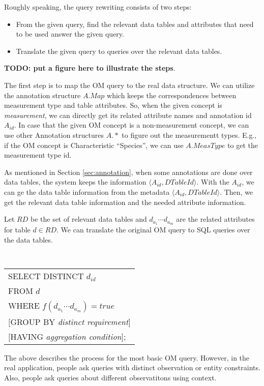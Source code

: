 \documentclass[conference]{IEEEtran}
\begin{document}
Roughly speaking, the query rewriting consists of two steps:
\begin{itemize}
\item From the given query, find the relevant data tables and
  attributes that need to be used answer the given query. 
\item Translate the given query to queries over the relevant data
  tables. 
\end{itemize}

{\bf TODO: put a figure here to illustrate the steps}. 

The first step is to map the OM query to the real data structure. 
We can utilize the annotation structure $A.Map$ which keeps the correspondences between
measurement type and table attributes. 
So, when the given concept is {\em measurement}, we can directly get
its related attribute names and annotation id $A_{id}$. 
In case that the given OM concept is a non-measurement concept, we can use
other Annotation structures $A.*$ to figure out the measurementt types. 
E.g., if the OM concept is Characteristic ``Species'', we can use
$A.MeasType$ to get the measurement type id. 

As mentioned in Section \ref{sec:annotation}, when some annotations are done over data tables, the system keeps the
information $\langle A_{id}, DTableId\rangle$. 
With the $A_{id}$, we can ge the data table information from the
metadata  $\langle A_{id}, DTableId\rangle$. 
Then, we get the relevant data table information and the needed attribute
information.

Let $RD$ be the set of relevant data tables and $d_{a_1} \cdots d_{a_m}$
are the related attributes for table $d\in RD$. We can translate the original OM query to SQL queries
over the data tables.  


\vspace{0.1in}
{\tt 
\begin{tabular}{l} 
SELECT DISTINCT $d_{id}$\\
FROM $d$\\
WHERE $f(d_{a_1} \cdots d_{a_m}) = true$\\
$[$GROUP BY {\em distinct requirement}$]$\\
$[$HAVING {\em aggregation condition}$]$;
\end{tabular}
}
\vspace{0.1in}

The above describes the process for the most basic OM query. 
However, in the real application, people ask queries with distinct
observation or entity constraints. Also, people ask queries about
different observatitons using context. 
\end{document}
